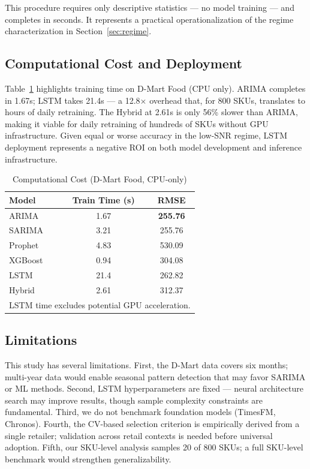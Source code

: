 \documentclass[journal]{IEEEtran}
\begin{document}
This procedure requires only descriptive statistics — no model training — and completes in seconds. It represents a practical operationalization of the regime characterization in Section~\ref{sec:regime}.

\subsection{Computational Cost and Deployment}

Table~\ref{tab:compute} highlights training time on D-Mart Food (CPU only). ARIMA completes in 1.67s; LSTM takes 21.4s — a 12.8$\times$ overhead that, for 800 SKUs, translates to hours of daily retraining. The Hybrid at 2.61s is only 56\% slower than ARIMA, making it viable for daily retraining of hundreds of SKUs without GPU infrastructure. Given equal or worse accuracy in the low-SNR regime, LSTM deployment represents a negative ROI on both model development and inference infrastructure.

\begin{table}[htbp]
\centering
\caption{Computational Cost (D-Mart Food, CPU-only)}
\label{tab:compute}
\begin{tabular}{lcc}
\toprule
\textbf{Model} & \textbf{Train Time (s)} & \textbf{RMSE} \\
\midrule
ARIMA   & 1.67  & \textbf{255.76} \\
SARIMA  & 3.21  & 255.76 \\
Prophet & 4.83  & 530.09 \\
XGBoost & 0.94  & 304.08 \\
LSTM    & 21.4  & 262.82 \\
Hybrid  & 2.61  & 312.37 \\
\bottomrule
\multicolumn{3}{l}{\small LSTM time excludes potential GPU acceleration.}
\end{tabular}
\end{table}

\subsection{Limitations}

This study has several limitations. First, the D-Mart data covers six months; multi-year data would enable seasonal pattern detection that may favor SARIMA or ML methods. Second, LSTM hyperparameters are fixed — neural architecture search may improve results, though sample complexity constraints are fundamental. Third, we do not benchmark foundation models (TimesFM, Chronos). Fourth, the CV-based selection criterion is empirically derived from a single retailer; validation across retail contexts is needed before universal adoption. Fifth, our SKU-level analysis samples 20 of 800 SKUs; a full SKU-level benchmark would strengthen generalizability.
\end{document}
